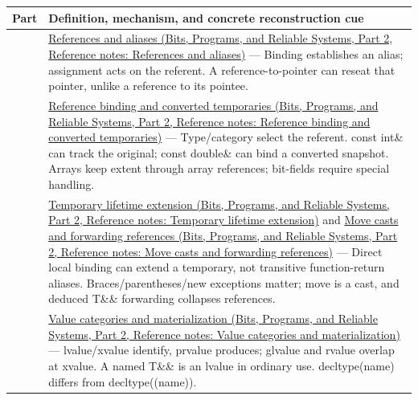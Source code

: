 {\def\LTcaptype{none} %
\begin{longtable}[]{@{}
  >{\raggedright\arraybackslash}p{}
  >{\raggedright\arraybackslash}p{}@{}}
\toprule\noalign{}
\begin{minipage}[b]{\linewidth}\raggedright
Part
\end{minipage} & \begin{minipage}[b]{\linewidth}\raggedright
Definition, mechanism, and concrete reconstruction cue
\end{minipage} \\
\midrule\noalign{}
\endhead
\bottomrule\noalign{}
\endlastfoot
113 & \href{../01-Bits-Programs-and-Reliable-Systems-P02/main.pdf\#appendix-d6d562ca9fbb}{References and aliases (Bits, Programs, and Reliable Systems, Part 2, Reference notes: References and aliases)} --- Binding establishes an alias; assignment acts on the referent. A reference-to-pointer can reseat that pointer, unlike a reference to its pointee. \\
114 & \href{../01-Bits-Programs-and-Reliable-Systems-P02/main.pdf\#appendix-37856d997bb0}{Reference binding and converted temporaries (Bits, Programs, and Reliable Systems, Part 2, Reference notes: Reference binding and converted temporaries)} --- Type/category select the referent. const int\& can track the original; const double\& can bind a converted snapshot. Arrays keep extent through array references; bit-fields require special handling. \\
115 & \href{../01-Bits-Programs-and-Reliable-Systems-P02/main.pdf\#appendix-a978b29bbbb0}{Temporary lifetime extension (Bits, Programs, and Reliable Systems, Part 2, Reference notes: Temporary lifetime extension)} and \href{../01-Bits-Programs-and-Reliable-Systems-P02/main.pdf\#appendix-0104b704fb11}{Move casts and forwarding references (Bits, Programs, and Reliable Systems, Part 2, Reference notes: Move casts and forwarding references)} --- Direct local binding can extend a temporary, not transitive function-return aliases. Braces/parentheses/new exceptions matter; move is a cast, and deduced T\&\& forwarding collapses references. \\
116 & \href{../01-Bits-Programs-and-Reliable-Systems-P02/main.pdf\#appendix-1121b30eaeb0}{Value categories and materialization (Bits, Programs, and Reliable Systems, Part 2, Reference notes: Value categories and materialization)} --- lvalue/xvalue identify, prvalue produces; glvalue and rvalue overlap at xvalue. A named T\&\& is an lvalue in ordinary use. decltype(name) differs from decltype((name)). \\

\end{longtable}}
